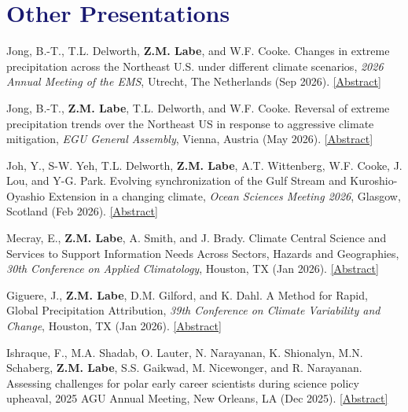 \documentclass[margin,line,palatino,courier,10pt]{res}
\begin{document}
\begin{resume}
\begin{etaremune}[leftmargin=0in,topsep=0in,parsep=0in]
\end{etaremune}

\section{\sc \textcolor{MidnightBlue}{\large{\textbf{Other Presentations}}}} 
\begin{etaremune}[leftmargin=0in,topsep=0in,parsep=0in]
\item Jong, B.-T., T.L. Delworth, \textbf{Z.M. Labe}, and W.F. Cooke. Changes in extreme precipitation across the Northeast U.S. under different climate scenarios, \textit{2026 Annual Meeting of the EMS}, Utrecht, The Netherlands (Sep 2026). \href{https://doi.org/10.5194/ems2026-565}{[Abstract]} 
\item Jong, B.-T., \textbf{Z.M. Labe}, T.L. Delworth, and W.F. Cooke. Reversal of extreme precipitation trends over the Northeast US in response to aggressive climate mitigation, \textit{EGU General Assembly}, Vienna, Austria (May 2026). \href{https://doi.org/10.5194/egusphere-egu26-5420}{[Abstract]}
\item Joh, Y., S-W. Yeh, T.L. Delworth, \textbf{Z.M. Labe}, A.T. Wittenberg, W.F. Cooke, J. Lou, and Y-G. Park. Evolving synchronization of the Gulf Stream and Kuroshio-Oyashio Extension in a changing climate, \textit{Ocean Sciences Meeting 2026}, Glasgow, Scotland (Feb 2026). \href{https://agu.confex.com/agu/osm26/meetingapp.cgi/Paper/2011907}{[Abstract]}
\item Mecray, E., \textbf{Z.M. Labe}, A. Smith, and J. Brady. Climate Central Science and Services to Support Information Needs Across Sectors, Hazards and Geographies, \textit{30th Conference on Applied Climatology}, Houston, TX (Jan 2026). \href{https://ams.confex.com/ams/106ANNUAL/meetingapp.cgi/Paper/477971}{[Abstract]}
\item Giguere, J., \textbf{Z.M. Labe}, D.M. Gilford, and K. Dahl. A Method for Rapid, Global Precipitation Attribution, \textit{39th Conference on Climate Variability and Change}, Houston, TX (Jan 2026). \href{https://ams.confex.com/ams/106ANNUAL/meetingapp.cgi/Paper/467538}{[Abstract]}
\item Ishraque, F., M.A. Shadab, O. Lauter, N. Narayanan, K. Shionalyn, M.N. Schaberg, \textbf{Z.M. Labe}, S.S. Gaikwad, M. Nicewonger, and R. Narayanan. Assessing challenges for polar early career scientists during science policy upheaval, 2025 AGU Annual Meeting, New Orleans, LA (Dec 2025). \href{https://agu.confex.com/agu/agu25/meetingapp.cgi/Paper/1904944}{[Abstract]}

\end{etaremune}
\end{resume}
\end{document}
